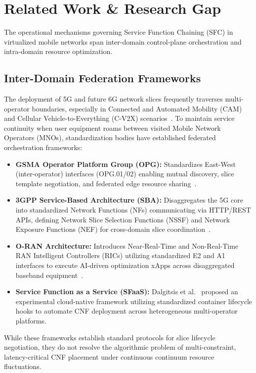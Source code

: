 \documentclass[conference]{IEEEtran}
\begin{document}
\section{Related Work \& Research Gap}
\label{sec:related}

The operational mechanisms governing Service Function Chaining (SFC) in virtualized mobile networks span inter-domain control-plane orchestration and intra-domain resource optimization.

\subsection{Inter-Domain Federation Frameworks}
The deployment of 5G and future 6G network slices frequently traverses multi-operator boundaries, especially in Connected and Automated Mobility (CAM) and Cellular Vehicle-to-Everything (C-V2X) scenarios~\cite{dalgitsis2024federation}. To maintain service continuity when user equipment roams between visited Mobile Network Operators (MNOs), standardization bodies have established federated orchestration frameworks:
\begin{itemize}
    \item \textbf{GSMA Operator Platform Group (OPG):} Standardizes East-West (inter-operator) interfaces (OPG.01/02) enabling mutual discovery, slice template negotiation, and federated edge resource sharing~\cite{gsma_opg01}.
    \item \textbf{3GPP Service-Based Architecture (SBA):} Disaggregates the 5G core into standardized Network Functions (NFs) communicating via HTTP/REST APIs, defining Network Slice Selection Functions (NSSF) and Network Exposure Functions (NEF) for cross-domain slice coordination~\cite{3gpp_ts23501}.
    \item \textbf{O-RAN Architecture:} Introduces Near-Real-Time and Non-Real-Time RAN Intelligent Controllers (RICs) utilizing standardized E2 and A1 interfaces to execute AI-driven optimization xApps across disaggregated baseband equipment~\cite{oran_arch}.
    \item \textbf{Service Function as a Service (SFaaS):} Dalgitsis et al.~\cite{dalgitsis2024federation} proposed an experimental cloud-native framework utilizing standardized container lifecycle hooks to automate CNF deployment across heterogeneous multi-operator platforms.
\end{itemize}
While these frameworks establish standard protocols for slice lifecycle negotiation, they do not resolve the algorithmic problem of multi-constraint, latency-critical CNF placement under continuous continuum resource fluctuations.
\end{document}
